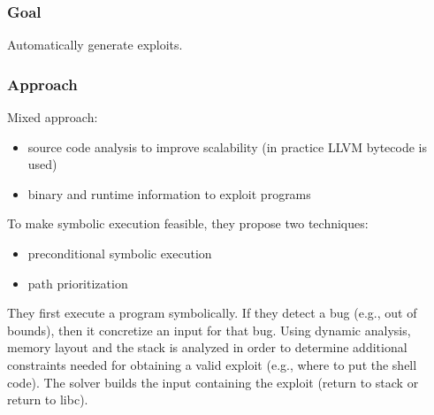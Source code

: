 \documentclass[10pt, a4paper]{article}
\begin{document}
\subsubsection{Goal}
Automatically generate exploits.

\subsubsection{Approach}

Mixed approach: 
\begin{itemize}
  \item source code analysis to improve scalability (in practice LLVM bytecode is used)
  \item binary and runtime information to exploit programs
\end{itemize}

To make symbolic execution feasible, they propose two techniques:
\begin{itemize}
  \item preconditional symbolic execution
  \item path prioritization
\end{itemize}

They first execute a program symbolically. If they detect a bug (e.g., out of bounds), then it concretize an input for that bug. Using dynamic analysis, memory layout and the stack is analyzed in order to determine additional constraints needed for obtaining a valid exploit (e.g., where to put the shell code). The solver builds the input containing the exploit (return to stack or return to libc).\\
\end{document}
